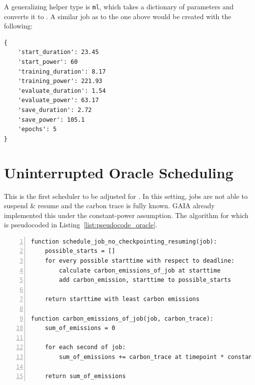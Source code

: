 A generalizing helper type is \verb|ml|, which takes a dictionary of parameters and converts it to \modelname{}. A similar job as to the one above would be created with the following:

\begin{minipage}{\linewidth}
\begin{lstlisting}[frame=single, numbers=none, caption={Generic definition for machine learning jobs}, label={list:roberta_model_definition_generic}, basicstyle=\ttfamily]
{
    'start_duration': 23.45
    'start_power': 60
    'training_duration': 8.17
    'training_power': 221.93
    'evaluate_duration': 1.54
    'evaluate_power': 63.17
    'save_duration': 2.72
    'save_power': 105.1
    'epochs': 5
}
\end{lstlisting}
\end{minipage}

\section{Uninterrupted Oracle Scheduling} \label{sec:uninterrupted_oracle_scheduling}

This is the first scheduler to be adjusted for \modelname{}.
In this setting, jobs are not able to suspend \& resume and the carbon trace is fully known.
GAIA already implemented this under the constant-power assumption.
The algorithm for which is pseudocoded in Listing~\ref{list:pseudocode_oracle}.

\begin{minipage}{\linewidth}
\begin{lstlisting}[frame=single, numbers=left, caption={Pseudocode for GAIA's non-interrupt oracle scheduler}, label={list:pseudocode_oracle}, basicstyle=\ttfamily]
function schedule_job_no_checkpointing_resuming(job):
    possible_starts = []
    for every possible starttime with respect to deadline:
        calculate carbon_emissions_of_job at starttime
        add carbon_emission, starttime to possible_starts
    
    return starttime with least carbon emissions

function carbon_emissions_of_job(job, carbon_trace):
    sum_of_emissions = 0

    for each second of job:
        sum_of_emissions += carbon_trace at timepoint * constant_watt
    
    return sum_of_emissions
\end{lstlisting}
\end{minipage}

